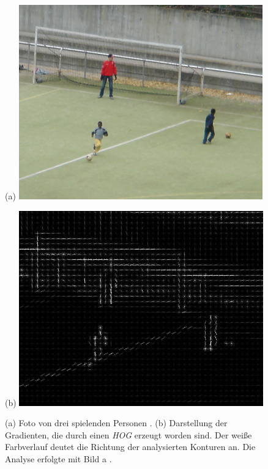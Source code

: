 
\begin{figure}[H]
	\centering
	\begin{minipage}[b]{0.49\textwidth}
		(a)
		\includegraphics[width=0.94\textwidth]{Bilder/hog1crop.png}
	\end{minipage}
	\hfill
	\begin{minipage}[b]{0.49\textwidth}
		(b)
		\includegraphics[width=0.94\textwidth]{Bilder/hog2crop.jpg}
	\end{minipage}
	\caption{(a) Foto von drei spielenden Personen \cite{inria1}. (b) Darstellung der Gradienten, die durch einen \textit{HOG} erzeugt worden sind. Der weiße Farbverlauf deutet die Richtung der analysierten Konturen an. Die Analyse erfolgte mit Bild a \cite{inria1}.}
	\label{fiq: hog}
\end{figure}
